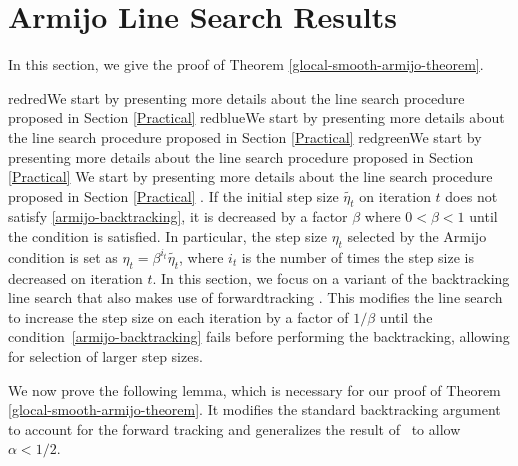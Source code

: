 \documentclass[10pt]{article} %
\newif\ifshowcolours
\def\red{red}
\def\blue{blue}
\def\green{green}
\renewcommand{\textcolor}[2]{%
  \ifshowcolours
    {\color{#1}#2}%
  \else
    \def\temp{#1}%
    \ifx\temp\red     #2\else
    \ifx\temp\blue    #2\else
    \ifx\temp\green   #2\else
        {\color{#1}#2}%
    \fi\fi\fi
  \fi
}
\begin{document}
\section{Armijo Line Search Results}\label{armijo-line-search-proof}
In this section, we give the proof of Theorem \ref{glocal-smooth-armijo-theorem}. \textcolor{red}{We start by presenting more details about the line search procedure proposed in Section \ref{Practical}}. If the initial step size $\tilde{\eta_{t}}$ on iteration $t$ does not satisfy \ref{armijo-backtracking}, it is decreased by a factor $\beta$ where $0 < \beta < 1$ until the condition is satisfied. In particular, the step size $\eta_{t}$ selected by the Armijo condition is set as $\eta_{t} = \beta^{i_{t}}\tilde{\eta_{t}}$, where $i_{t}$ is the number of times the step size is decreased on iteration $t$. In this section, we focus on a variant of the backtracking line search that also makes use of forwardtracking \citep{fridovich2019choosing}. This modifies the line search to increase the step size on each iteration by a factor of $1/\beta$ until the condition~\eqref{armijo-backtracking} fails before performing the backtracking, allowing for selection of larger step sizes.

We now prove the following lemma, which is necessary for our proof of Theorem \ref{glocal-smooth-armijo-theorem}. It modifies the standard backtracking argument~\citep{boyd2004} to account for the forward tracking and generalizes the result of~ \citet{fridovich2019choosing} to allow $\alpha < 1/2$.
\end{document}
